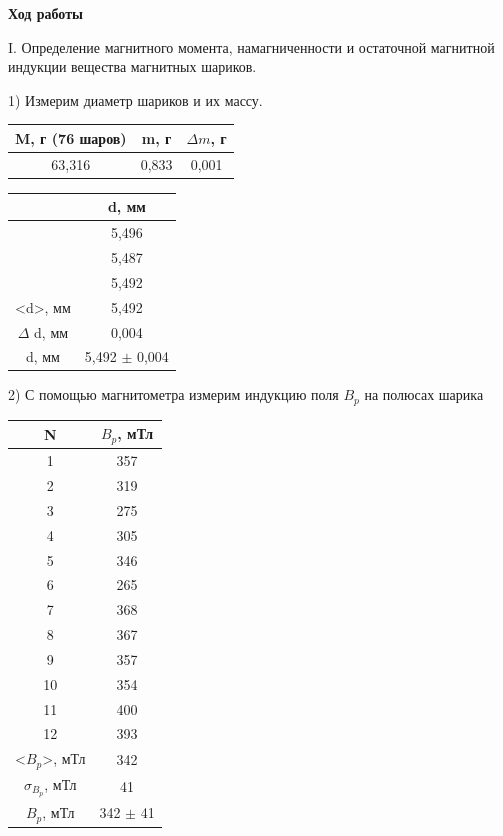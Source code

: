 \documentclass[a4paper,12pt]{article}
\begin{document}
\textbf{Ход работы}

I. Определение магнитного момента, намагниченности и остаточной магнитной индукции вещества магнитных шариков. 

1) Измерим диаметр шариков и их массу.

\begin{center}
\begin{tabular}{|c|c|c|}
	\hline
	M, г (76 шаров) & m, г & $\Delta m$, г \\
	\hline
	63,316 & 0,833 & 0,001 \\
	\hline
\end{tabular}
\end{center}
\qquad
\begin{center}
\begin{tabular}{|c|c|}
	\hline
	& d, мм \\
	\hline
	& 5,496 \\
	\hline
	& 5,487 \\
	\hline
	& 5,492 \\
	\hline
	<d>, мм & 5,492 \\
	\hline
	$\Delta$ d, мм & 0,004 \\
	\hline
	d, мм & 5,492 $\pm$ 0,004 \\
	\hline
\end{tabular}
\end{center}

2) С помощью магнитометра измерим индукцию поля $B_p$ на полюсах шарика 

\begin{center}
\begin{tabular}{|c|c|}
	\hline
	N & $B_p$, мТл \\
	\hline
	1 & 357 \\
	\hline
	2 & 319 \\
	\hline
	3 & 275 \\
	\hline
	4 & 305 \\
	\hline
	5 & 346 \\
	\hline
	6 & 265 \\
	\hline
	7 & 368 \\
	\hline
	8 & 367 \\
	\hline
	9 & 357 \\
	\hline
	10 & 354 \\
	\hline
	11 & 400 \\
	\hline
	12 & 393 \\
	\hline
	<$B_p$>, мТл & 342 \\
	\hline
	$\sigma_{B_p}$, мТл & 41 \\
	\hline
	$B_p$, мТл & 342 $\pm$ 41 \\
	\hline
\end{tabular}
\end{center}
\end{document}
